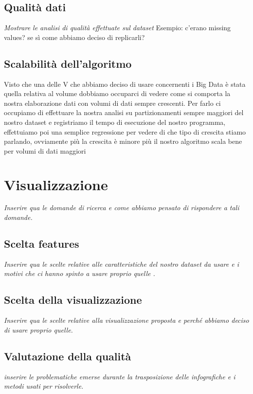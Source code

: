 \documentclass[10pt, a4paper,openany]{article}
\begin{document}
\subsection*{Qualità dati}
\textit{Mostrare le analisi di qualità effettuate sul dataset} Esempio: c'erano missing values? se sì come abbiamo deciso di replicarli?

\subsection*{Scalabilità dell'algoritmo}

Visto che una delle V che abbiamo deciso di usare concernenti i Big Data è stata quella relativa al volume dobbiamo occuparci di vedere come si comporta la nostra elaborazione dati con volumi di dati sempre crescenti. Per farlo ci occupiamo di effettuare la nostra analisi su partizionamenti sempre maggiori del nostro dataset e registriamo il tempo di esecuzione del nostro programma, effettuiamo poi una semplice regressione per vedere di che tipo di crescita stiamo parlando, ovviamente più la crescita è minore più il nostro algoritmo scala bene per volumi di dati maggiori
\section*{Visualizzazione}

\textit{Inserire qua le domande di ricerca e come abbiamo pensato di rispondere a tali domande.}

\subsection*{Scelta features}
\textit{Inserire qua le scelte relative alle caratteristiche del nostro dataset da usare e i motivi che ci hanno spinto a usare proprio quelle .}
\subsection*{Scelta della visualizzazione}
\textit{Inserire qua le scelte relative alla visualizzazione proposta e perché abbiamo deciso di usare proprio quelle.}
\subsection*{Valutazione della qualità}
\textit{inserire le problematiche emerse durante la trasposizione delle infografiche e i metodi usati per risolverle.}
\end{document}
